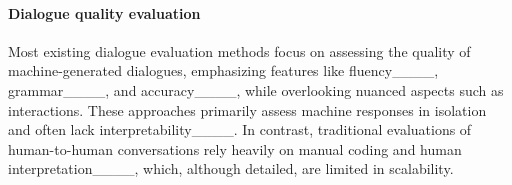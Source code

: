 
\paragraph{Dialogue quality evaluation}


Most existing dialogue evaluation methods focus on assessing the quality of machine-generated dialogues, emphasizing features like fluency____, grammar____, and  accuracy____, while overlooking nuanced aspects such as interactions. These approaches primarily assess machine responses in isolation and often lack interpretability____. In contrast, traditional evaluations of human-to-human conversations rely heavily on manual coding and human interpretation____, which, although detailed, are limited in scalability.

